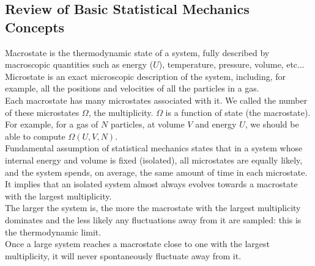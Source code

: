 \subsection{Review of Basic Statistical Mechanics Concepts}

Macrostate is the thermodynamic state of a system, fully described by macroscopic quantities such as energy ($U$), temperature, pressure, volume, etc... \\

Microstate is an exact microscopic description of the system, including, for example, all the positions and velocities of all the particles in a gas. \\

Each macrostate has many microstates associated with it. We called the number of these microstates $\Omega$, the multiplicity. $\Omega$ is a function of state (the macrostate). \\

For example, for a gas of $N$ particles, at volume $V$ and energy $U$, we should be able to compute $\Omega(U,V,N)$. \\

Fundamental assumption of statistical mechanics states that in a system whose internal energy and volume is fixed (isolated), all microstates are equally likely, and the system spends, on average, the same amount of time in each microstate. \\

It implies that an isolated system almost always evolves towards a macrostate with the largest multiplicity. \\

The larger the system is, the more the macrostate with the largest multiplicity dominates and the less likely any fluctuations away from it are sampled: this is the thermodynamic limit. \\

Once a large system reaches a macrostate close to one with the largest multiplicity, it will never spontaneously fluctuate away from it.
